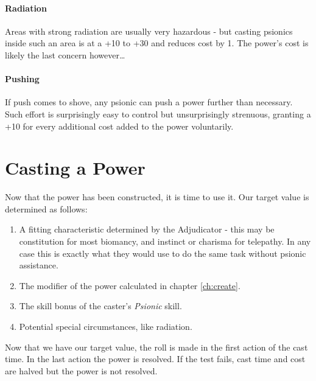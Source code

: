 \documentclass[12pt,a4paper,openany,usenames,dvipsnames]{book}
\begin{document}
	\subsubsection{Radiation}
	Areas with strong radiation are usually very hazardous - but casting psionics inside such an area is at a +10 to +30 and reduces cost by 1. The power’s cost is likely the last concern however…
	\subsubsection{Pushing}
	If push comes to shove, any psionic can push a power further than necessary. Such effort is surprisingly easy to control but unsurprisingly strenuous, granting a +10 for every additional cost added to the power voluntarily.

	\chapter{Casting a Power}
	Now that the power has been constructed, it is time to use it. Our target value is determined as follows:
	\begin{enumerate}
		\item A fitting characteristic determined by the Adjudicator
			- this may be constitution for most biomancy, and instinct or charisma for telepathy.
			In any case this is exactly what they would use to do the same task without psionic assistance.
		\item The modifier of the power calculated in chapter \ref{ch:create}.
		\item The skill bonus of the caster's \emph{Psionic} skill.
		\item Potential special circumstances, like radiation.
	\end{enumerate}
	Now that we have our target value, the roll is made in the first action of the cast time. In the last action the power is resolved. If the test fails, cast time and cost are halved but the power is not resolved.
\end{document}
